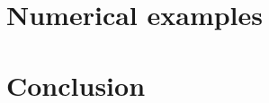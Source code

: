 \section{Numerical examples}\label{Sec:NumerExam}


\section{Conclusion}\label{Sec:Concl}





%
%



